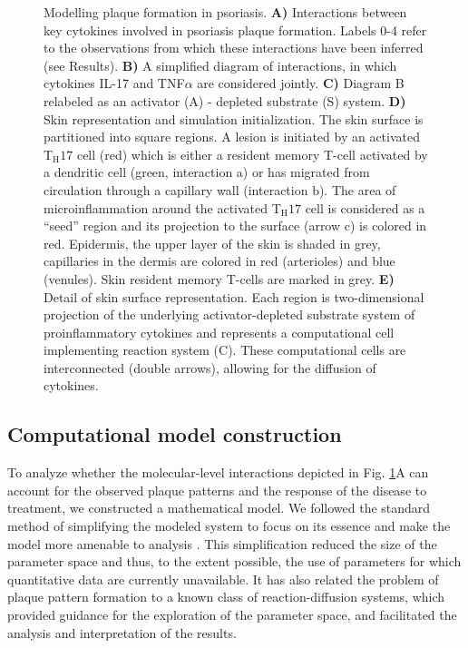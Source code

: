 \begin{figure}[p]
	\centering
	\caption[Modelling plaque formation in psoriasis]{Modelling plaque formation in psoriasis. \textbf{A)} Interactions between key cytokines involved in psoriasis plaque formation. Labels 0-4 refer to the observations from which these interactions have been inferred (see Results). \textbf{B)} A simplified diagram of interactions, in which cytokines IL-17 and TNF$\alpha$ are considered jointly. \textbf{C)} Diagram B relabeled as an activator (A) - depleted substrate (S) system. \textbf{D)} Skin representation and simulation initialization. The skin surface is partitioned into square regions. A lesion is initiated by an activated T$_{\text{H}}17$ cell (red) which is either a resident memory T-cell activated by a dendritic cell (green, interaction a) or has migrated from circulation through a capillary wall (interaction b). The area of microinflammation around the activated T$_{\text{H}}17$ cell is considered as a “seed” region and its projection to the surface (arrow c) is colored in red.  Epidermis, the upper layer of the skin is shaded in grey, capillaries in the dermis are colored in red (arterioles) and blue (venules). Skin resident memory T-cells are marked in grey. \textbf{E)} Detail of skin surface representation. Each region is two-dimensional projection of the underlying activator-depleted substrate system of proinflammatory cytokines and represents a computational cell implementing reaction system (C). These computational cells are interconnected (double arrows), allowing for the diffusion of cytokines.}
	\label{fig:2}
\end{figure}

\subsection{Computational model construction}
To analyze whether the molecular-level interactions depicted in Fig. \ref{fig:2}A can account for the observed plaque patterns and the response of the disease to treatment, we constructed a mathematical model. We followed the standard method of simplifying the modeled system to focus on its essence and make the model more amenable to analysis \citep{bak1996, gaines1977, prusinkiewicz1998}. This simplification reduced the size of the parameter space and thus, to the extent possible, the use of parameters for which quantitative data are currently unavailable. It has also related the problem of plaque pattern formation to a known class of reaction-diffusion systems, which provided guidance for the exploration of the parameter space, and facilitated the analysis and interpretation of the results.
 

